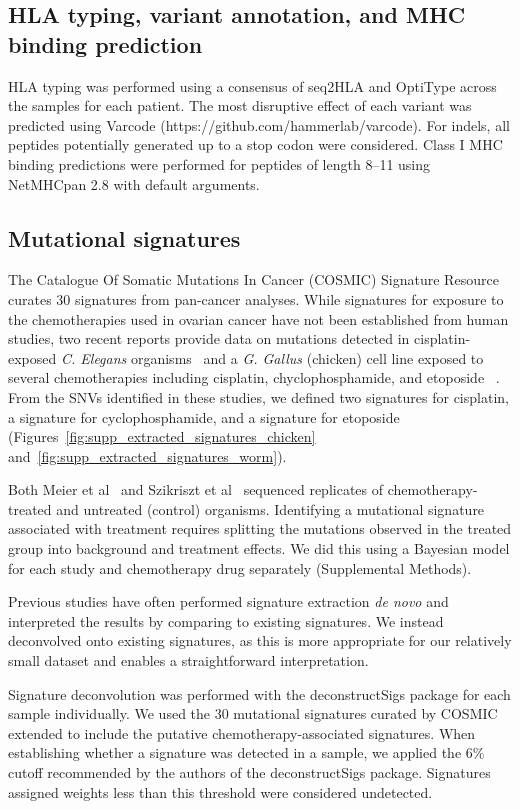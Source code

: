 \subsection*{HLA typing, variant annotation, and MHC binding prediction}
\begin{sloppypar}
HLA typing was performed using a consensus of seq2HLA\cite{Boegel_2012} and OptiType\cite{Szolek_2014} across the samples for each patient. The most disruptive effect of each variant was predicted using Varcode (https://github.com/hammerlab/varcode). For indels, all peptides potentially generated up to a stop codon were considered. Class I MHC binding predictions were performed for peptides of length 8--11 using NetMHCpan 2.8\cite{Lundegaard_2008} with default arguments.
\end{sloppypar}

\subsection*{Mutational signatures}
The Catalogue Of Somatic Mutations In Cancer (COSMIC) Signature Resource curates 30 signatures from pan-cancer analyses. While signatures for exposure to the chemotherapies used in ovarian cancer have not been established from human studies, two recent reports provide data on mutations detected in cisplatin-exposed \textit{C. Elegans} organisms~\cite{Meier_2014} and a \textit{G. Gallus} (chicken) cell line exposed to several chemotherapies including cisplatin, chyclophosphamide, and etoposide ~\cite{Szikriszt_2016}. From the SNVs identified in these studies, we defined two signatures for cisplatin, a signature for cyclophosphamide, and a signature for etoposide (Figures~\ref{fig:supp_extracted_signatures_chicken} and~\ref{fig:supp_extracted_signatures_worm}).

Both Meier et al~\cite{Meier_2014} and Szikriszt et al~\cite{Szikriszt_2016} sequenced replicates of chemotherapy-treated and untreated (control) organisms. Identifying a mutational signature associated with treatment requires splitting the mutations observed in the treated group into background and treatment effects. We did this using a Bayesian model for each study and chemotherapy drug separately (Supplemental Methods).

Previous studies have often performed signature extraction \textit{de novo} and interpreted the results by comparing to existing signatures. We instead deconvolved onto existing signatures, as this is more appropriate for our relatively small dataset and enables a straightforward interpretation.

Signature deconvolution was performed with the deconstructSigs\cite{Rosenthal_2016} package for each sample individually. We used the 30 mutational signatures curated by COSMIC~\cite{364242} extended to include the putative chemotherapy-associated signatures. When establishing whether a signature was detected in a sample, we applied the 6\% cutoff recommended by the authors of the deconstructSigs package. Signatures assigned weights less than this threshold were considered undetected.
